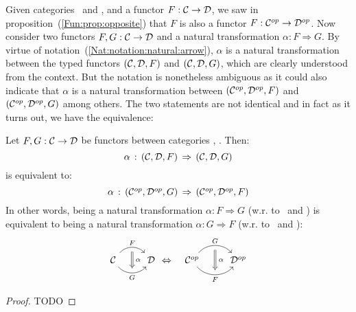 Given categories \Cat\ and \Dat, and a functor $F:\mbox{$\cal C$}\to\mbox{$\cal D$}$, we saw
in proposition~(\ref{Fun:prop:opposite}) that $F$ is also a functor 
$F:\mbox{${\cal C}^{op}$}\to\mbox{${\cal D}^{op}$}$. Now consider two functors $F,G:\mbox{$\cal C$}\to\mbox{$\cal D$}$ and a natural 
transformation $\alpha:F \Rightarrow G$. By virtue of 
notation~(\ref{Nat:notation:natural:arrow}), $\alpha$ is a natural 
transformation between the typed functors $(\mbox{$\cal C$},\mbox{$\cal D$},F)$ and $(\mbox{$\cal C$},\mbox{$\cal D$},G)$, 
which are clearly understood from the context. But the notation is nonetheless 
ambiguous as it could also indicate that $\alpha$ is a natural
transformation between $(\mbox{${\cal C}^{op}$},\mbox{${\cal D}^{op}$},F)$ and $(\mbox{${\cal C}^{op}$},\mbox{${\cal D}^{op}$},G)$ among others. 
The two statements are not identical and in fact as it turns out, we
have the equivalence:

\begin{prop}
    Let $F,G:\mbox{$\cal C$}\to\mbox{$\cal D$}$ be functors between categories \Cat, \Dat. Then: 
    \[
        \alpha\,:\,(\mbox{$\cal C$},\mbox{$\cal D$},F)\,\Rightarrow\,(\mbox{$\cal C$},\mbox{$\cal D$},G)
    \]
    is equivalent to:
    \[
        \alpha\,:\,(\mbox{${\cal C}^{op}$},\mbox{${\cal D}^{op}$},G)\,\Rightarrow\,(\mbox{${\cal C}^{op}$},\mbox{${\cal D}^{op}$},F)
    \]
    In other words, being a natural transformation $\alpha:F\Rightarrow G$ (w.r.
    to \Cat\ and \Dat) is equivalent to being a natural transformation 
    $\alpha:G\Rightarrow F$ (w.r. to \Cop\ and \Dop):
    \begin{eqnarray}
        \begin{tikzcd}
            \Cat \arrow[r, "F", bend left  = 50, ""{name=U, below}]
                 \arrow[r, swap, "G", bend right = 50, ""{name=D, above}]
              & \Dat
            \arrow[Rightarrow, "\,\alpha", from = U, to = D]
        \end{tikzcd}
        &\Leftrightarrow&
        \begin{tikzcd}
            \Cop \arrow[r, "G", bend left  = 50, ""{name=U, below}]
                 \arrow[r, swap, "F", bend right = 50, ""{name=D, above}]
              & \Dop
            \arrow[Rightarrow, "\,\alpha", from = U, to = D]
        \end{tikzcd}
    \end{eqnarray}
\end{prop}
\begin{proof}
TODO
\end{proof}


